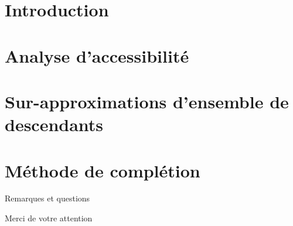 \documentclass[xcolor={dvipsnames}]{beamer}
\begin{document}
\maketitle

\section{Introduction}


\section{Analyse d'accessibilité}


\section{Sur-approximations d'ensemble de descendants}


\section{Méthode de complétion}


\begin{frame}{Remarques et questions}
  \begin{center}
    Merci de votre attention
  \end{center}
\end{frame}
\end{document}
